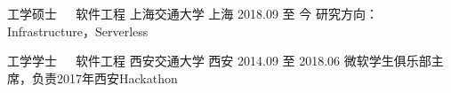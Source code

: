 

\begin{cventries}

  \cventry
    {工学硕士~~~软件工程} %
    {上海交通大学} %
    {上海} %
    {2018.09 至 今} %
    {研究方向：Infrastructure，Serverless}

  \cventry
    {工学学士~~~软件工程} %
    {西安交通大学} %
    {西安} %
    {2014.09 至 2018.06} %
    {微软学生俱乐部主席，负责2017年西安Hackathon}

\end{cventries}
